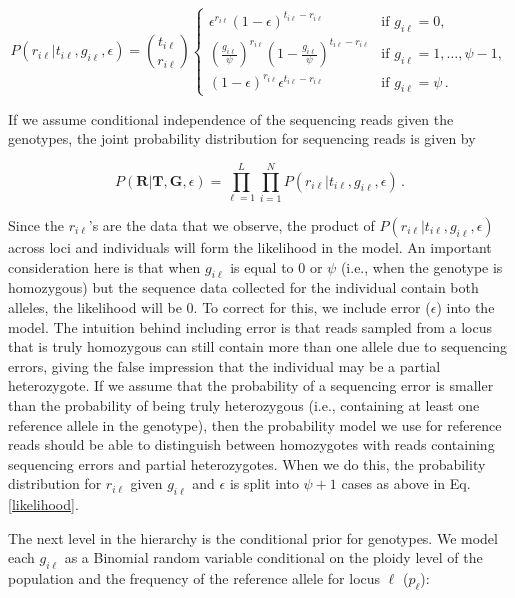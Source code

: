 \documentclass[11pt,english,letterpaper,oneside]{article}
\begin{document}
\begin{equation}\label{likelihood}
P(r_{i \ell}|t_{i\ell}, g_{i \ell},\epsilon) = \binom{t_{i \ell}}{r_{i \ell}}
	\begin{cases}
	\epsilon^{r_{i \ell}}(1-\epsilon)^{t_{i \ell}-r_{i \ell}} & \text{if  } g_{i \ell} = 0, \\[0.05in]
	\left(\frac{g_{i \ell}}{\psi}\right)^{r_{i \ell}}\left(1-\frac{g_{i \ell}}{\psi}\right)^{t_{i \ell}-r_{i \ell}} & \text{if  } g_{i \ell} = 1,\ldots,\psi-1, \\[0.05in]
	(1-\epsilon)^{r_{i \ell}}\epsilon^{t_{i \ell}-r_{i \ell}} & \text{if  } g_{i \ell} = \psi\,.
	\end{cases}
\end{equation}

\noindent If we assume conditional independence of the sequencing reads given the genotypes, the joint probability distribution for sequencing reads is given by

\begin{equation}\label{factored_lik}
P(\bm{R}|\bm{T},\bm{G}, \epsilon) = \displaystyle\prod_{\ell=1}^L\displaystyle\prod_{i=1}^N P(r_{i \ell}|t_{i \ell},g_{i \ell}, \epsilon)\,.
\end{equation}

\noindent Since the $r_{i \ell}$'s are the data that we observe, the product of $P(r_{i \ell}|t_{i\ell}, g_{i \ell},\epsilon)$ across loci and individuals will form the likelihood in the model. An important consideration here is that when $g_{i \ell}$ is equal to 0 or $\psi$ (i.e., when the genotype is homozygous) but the sequence data collected for the individual contain both alleles, the likelihood will be 0. To correct for this, we include error ($\epsilon$) into the model. The intuition behind including error is that reads sampled from a locus that is truly homozygous can still contain more than one allele due to sequencing errors, giving the false impression that the individual may be a partial heterozygote. If we assume that the probability of a sequencing error is smaller than the probability of being truly heterozygous (i.e., containing at least one reference allele in the genotype), then the probability model we use for reference reads should be able to distinguish between homozygotes with reads containing sequencing errors and partial heterozygotes. When we do this, the probability distribution for $r_{i\ell}$ given $g_{i\ell}$ and $\epsilon$ is split into $\psi+1$ cases as above in Eq. \ref{likelihood}.
\medskip

The next level in the hierarchy is the conditional prior for genotypes. We model each $g_{i \ell}$ as a Binomial random variable conditional on the ploidy level of the population and the frequency of the reference allele for locus $\ell$ ($p_{\ell}$):
\end{document}

